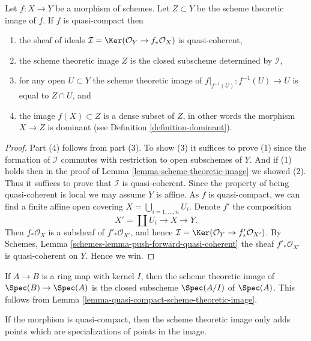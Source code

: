 \begin{lemma}
\label{lemma-quasi-compact-scheme-theoretic-image}
Let $f : X \to Y$ be a morphism of schemes.
Let $Z \subset Y$ be the scheme theoretic image of $f$.
If $f$ is quasi-compact then
\begin{enumerate}
\item the sheaf of ideals
$\mathcal{I} = \Ker(\mathcal{O}_Y \to f_*\mathcal{O}_X)$
is quasi-coherent,
\item the scheme theoretic image $Z$ is the closed subscheme
determined by $\mathcal{I}$,
\item for any open $U \subset Y$ the scheme theoretic image of
$f|_{f^{-1}(U)} : f^{-1}(U) \to U$ is equal to $Z \cap U$, and
\item the image $f(X) \subset Z$ is a dense subset of $Z$, in other
words the morphism $X \to Z$ is dominant
(see Definition \ref{definition-dominant}).
\end{enumerate}
\end{lemma}

\begin{proof}
Part (4) follows from part (3). To show (3) it suffices
to prove (1) since the formation of $\mathcal{I}$ commutes with restriction to
open subschemes of $Y$. And if (1) holds then in the proof of
Lemma \ref{lemma-scheme-theoretic-image}
we showed (2). Thus it suffices to prove that $\mathcal{I}$ is quasi-coherent.
Since the property of being quasi-coherent is
local we may assume $Y$ is affine. As $f$ is quasi-compact,
we can find a finite affine open covering
$X = \bigcup_{i = 1, \ldots, n} U_i$. Denote $f'$ the composition
$$
X' = \coprod U_i \longrightarrow X \longrightarrow Y.
$$
Then $f_*\mathcal{O}_X$ is a subsheaf of $f'_*\mathcal{O}_{X'}$,
and hence $\mathcal{I} = \Ker(\mathcal{O}_Y \to f'_*\mathcal{O}_{X'})$.
By Schemes, Lemma \ref{schemes-lemma-push-forward-quasi-coherent}
the sheaf $f'_*\mathcal{O}_{X'}$ is quasi-coherent on $Y$. Hence we win.
\end{proof}

\begin{example}
\label{example-scheme-theoretic-image}
If $A \to B$ is a ring map with kernel $I$, then the scheme theoretic image
of $\Spec(B) \to \Spec(A)$ is the closed subscheme
$\Spec(A/I)$ of $\Spec(A)$. This follows from
Lemma \ref{lemma-quasi-compact-scheme-theoretic-image}.
\end{example}

\noindent
If the morphism is quasi-compact, then the scheme theoretic image only
adds points which are specializations of points in the image.


